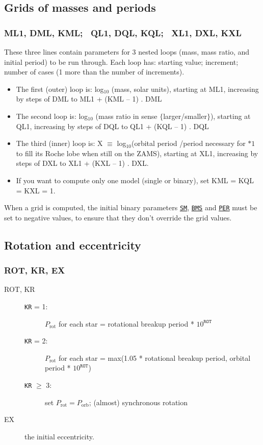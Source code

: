 \subsection{Grids of masses and periods}
\subsubsection*{ML1, DML, KML; ~QL1, DQL, KQL; ~XL1, DXL, KXL}
\label{sec:initrun_grids}

These three lines contain parameters for 3 nested loops (mass, mass ratio, and 
initial period) to be run through. Each loop has: starting value; increment; 
number of cases (1 more than the number of increments).
\begin{itemize} 
\item The first (outer) loop is:   log$_{10}$ (mass, solar units), starting at ML1, 
  increasing by steps of DML to ML1 + (KML -- 1) . DML
\item The second loop is:  log$_{10}$ (mass ratio in sense $\{$larger/smaller$\}$), 
  starting at QL1, increasing by steps of DQL to QL1 + (KQL -- 1) . DQL
\item The third (inner) loop is:   X $\equiv$ log$_{10}$(orbital period /{period necessary for 
    $*1$ to fill its Roche lobe when still on the ZAMS}), starting at XL1, increasing 
  by steps of DXL to XL1 + (KXL -- 1) . DXL.
\item If you want to compute only one model (single or binary), set KML = KQL = KXL = 1.
\end{itemize}

When a grid is computed, the initial binary parameters \hyperlink{sm}{\texttt{SM}},
\hyperlink{bms}{\texttt{BMS}} and \hyperlink{per}{\texttt{PER}} must be set to negative 
values, to ensure that they don't override the grid values.


\subsection{Rotation and eccentricity}
\subsubsection*{ROT, KR, EX}
\begin{description}
\item[ROT, KR]
  \begin{description} 
  \item[\texttt{KR} = 1:] $P_\mathrm{rot}$ for each star = rotational breakup period * $10^\texttt{ROT}$ 
  \item[\texttt{KR} = 2:] $P_\mathrm{rot}$ for each star = max(1.05 * rotational breakup period, orbital period * $10^\texttt{ROT}$) 
  \item[\texttt{KR} $\ge$ 3:] set $P_\mathrm{rot} = P_\mathrm{orb}$; (almost) synchronous rotation
  \end{description}
\item[EX] the initial eccentricity.
\end{description}


